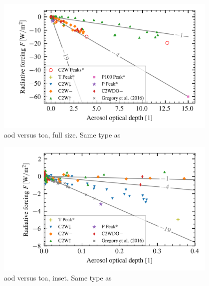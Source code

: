 \documentclass{ametsocV5}
\begin{document}
\begin{figure}
  \begin{center}
    \includegraphics[width=0.95\textwidth]{figures/aod_vs_toa_avg_full.png}
  \end{center}
  \caption{\acrshort{aod} versus \acrshort{toa}, full size. Same type as \cite{gregory2016}}
  \label{fig:aod_vs_toa_full}
\end{figure}

\begin{figure}
  \begin{center}
    \includegraphics[width=0.95\textwidth]{figures/aod_vs_toa_avg_inset.png}
  \end{center}
  \caption{\acrshort{aod} versus \acrshort{toa}, inset. Same type as \cite{gregory2016}}
  \label{fig:aod_vs_toa_inset}
\end{figure}
\end{document}
